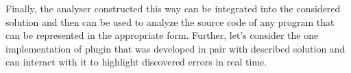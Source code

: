Finally, the analyser constructed this way can be integrated into the considered solution and then can be used to analyze the source code of any program that can be represented in the appropriate form.
Further, let's consider the one implementation of plugin that was developed in pair with described solution and can interact with it to highlight discovered errors in real time.

%
%
%
%

